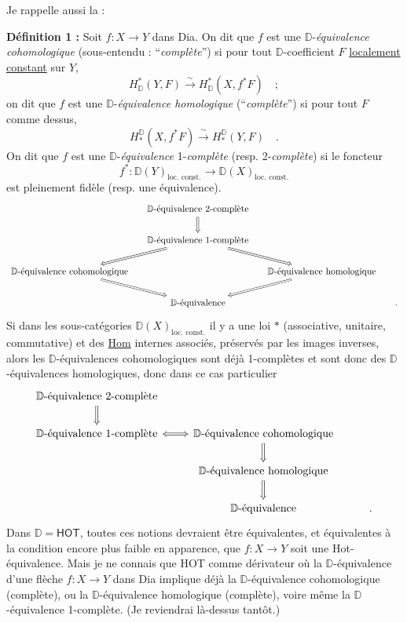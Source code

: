 \documentclass[11pt]{article}
\newcommand{\printedpage}[1]{\marginpar{\footnotesize p.~#1}}
\newcommand{\msp}[1]{\marginpar{\footnotesize [#1]}}
\newcommand{\HOT}{\textsf{HOT}}
\newcommand{\Hot}{\textsf{Hot}}
\newcommand{\Dia}{\textsf{Dia}}
\newcommand{\DD}{\mathbb{D}}
\begin{document}
Je rappelle aussi la :

\textbf{Définition 1 :} Soit $f : X \to Y$ dans \Dia. On dit que $f$ est une $\DD$-\textit{équivalence cohomologique} (sous-entendu : “\textit{complète}”) si pour tout $\DD$-coefficient $F$ \underline{localement} \underline{constant} sur $Y$,
\[ H^{*}_{\DD}(Y,F) \xrightarrow{\ \sim\ } H^{*}_{\DD}(X,f^{*}F) \quad ; \]
on dit que $f$ est une $\DD$-\textit{équivalence homologique} (“\textit{complète}”) si pour tout $F$ comme dessus,
\[ H_{*}^{\DD}(X,f^{*}F) \xrightarrow{\ \sim\ } H_{*}^{\DD}(Y,F) \quad . \]
On dit que $f$ est une $\DD$-\textit{équivalence} 1-\textit{complète} (resp. 2-\textit{complète}) si le foncteur
\[ f^{*} : \DD(Y)_{\text{loc. const.}} \longrightarrow \DD(X)_{\text{loc. const.}} \]
est pleinement fidèle (resp. une équivalence).
\[
\begin{tikzcd}[column sep=small]
 & \text{$\DD$-équivalence 2-complète} \arrow[d, Rightarrow] & & \\
 & \text{$\DD$-équivalence 1-complète} \arrow[dl, Rightarrow] \arrow[dr, Rightarrow] & & \\
\text{$\DD$-équivalence cohomologique} \arrow[dr, Rightarrow] & & \text{$\DD$-équivalence homologique} \arrow[dl, Rightarrow] & \\
 & \text{$\DD$-équivalence} & & .
\end{tikzcd}
\]
Si dans les sous-catégories $\DD(X)_{\text{loc. const.}}$ il y a une loi $*$ (associative, unitaire, commutative) et des \underline{\textsf{Hom}} internes associés, préservés par les images inverses, alors les $\DD$-équivalences cohomologiques sont déjà 1-complètes et sont donc des $\DD$-équivalences homologiques, donc dans ce cas particulier
\printedpage{68}
\msp{page 114: blank}
\msp{page 115}
\[
\begin{tikzcd}
\text{$\DD$-équivalence 2-complète} \arrow[d, Rightarrow] & & \\
\text{$\DD$-équivalence 1-complète} \arrow[r, Leftrightarrow] & \text{$\DD$-équivalence cohomologique} \arrow[d, Rightarrow] & \\
 & \text{$\DD$-équivalence homologique} \arrow[d, Rightarrow] & \\
 & \text{$\DD$-équivalence} & .
\end{tikzcd}
\]
Dans $\DD = \mathsf{HOT}$, toutes ces notions devraient être équivalentes, et équivalentes à la condition encore plus faible en apparence, que $f : X \to Y$ soit une \Hot-équivalence. Mais je ne connais que \HOT{} comme dérivateur où la $\DD$-équivalence d'une flèche $f : X \to Y$ dans \Dia{} implique déjà la $\DD$-équivalence cohomologique (complète), ou la $\DD$-équivalence homologique (complète), voire même la $\DD$-équivalence 1-complète. (Je reviendrai là-dessus tantôt.)
\end{document}
